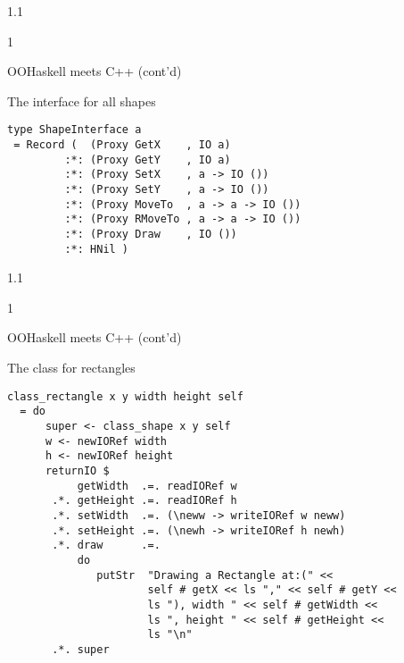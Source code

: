 \documentclass{slides}
\newenvironment{myslide}{\begin{slide}\color{Blue}\begin{boxedminipage}{1.1\hsize}\begin{boxedminipage}{1\hsize}\color{Black}
\vspace{-170\in}
}{%
\smallskip
\end{boxedminipage}
\end{boxedminipage}
\end{slide}}
\newenvironment{myslide}{\begin{slide}
}{%
\end{slide}}
\newenvironment{myslide}{\begin{slide}\color{White}\begin{boxedminipage}{1.1\hsize}\color{Black}
\vspace{-170\in}
}{%
\smallskip
\end{boxedminipage}
\end{slide}}
\newcommand{\header}[1]{{\large \color{Red} #1}}
\begin{document}



\begin{myslide}

\header{OOHaskell meets C++ (cont'd)}

The interface for all shapes

{\tiny

\begin{verbatim}
type ShapeInterface a
 = Record (  (Proxy GetX    , IO a)
         :*: (Proxy GetY    , IO a)
         :*: (Proxy SetX    , a -> IO ())
         :*: (Proxy SetY    , a -> IO ())
         :*: (Proxy MoveTo  , a -> a -> IO ())
         :*: (Proxy RMoveTo , a -> a -> IO ())
         :*: (Proxy Draw    , IO ())
         :*: HNil )
\end{verbatim}

}

\end{myslide}






\begin{myslide}

\header{OOHaskell meets C++ (cont'd)}

The class for rectangles

{\tiny

\begin{verbatim}
class_rectangle x y width height self
  = do
      super <- class_shape x y self
      w <- newIORef width
      h <- newIORef height
      returnIO $
           getWidth  .=. readIORef w
       .*. getHeight .=. readIORef h
       .*. setWidth  .=. (\neww -> writeIORef w neww)
       .*. setHeight .=. (\newh -> writeIORef h newh)
       .*. draw      .=. 
           do
              putStr  "Drawing a Rectangle at:(" <<
                      self # getX << ls "," << self # getY <<
                      ls "), width " << self # getWidth <<
                      ls ", height " << self # getHeight <<
                      ls "\n"
       .*. super
\end{verbatim}

}

\end{myslide}



\end{document}
